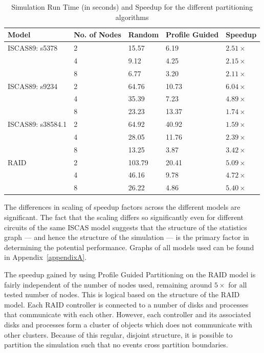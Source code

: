\documentclass[11pt]{book}
\begin{document}
\begin{table}[h]\label{tab:benchmarks}
\centering
\begin{tabular}{@{}lllll@{}}
\toprule
Model             & No. of Nodes & Random & Profile Guided & Speedup           \\ \midrule
ISCAS89: s5378    & 2            & 15.57  & 6.19           & \(2.51\times\)    \\
                  & 4            & 9.12   & 4.25           & \(2.15\times\)    \\
                  & 8            & 6.77   & 3.20           & \(2.11\times\)    \\ \midrule
ISCAS89: s9234    & 2            & 64.76  & 10.73          & \(6.04\times\)    \\
                  & 4            & 35.39  & 7.23           & \(4.89\times\)    \\
                  & 8            & 23.23  & 13.37          & \(1.74\times\)    \\ \midrule
ISCAS89: s38584.1 & 2            & 64.92  & 40.92          & \(1.59\times\)    \\
                  & 4            & 28.05  & 11.76          & \(2.39\times\)    \\
                  & 8            & 13.25  & 3.87           & \(3.42\times\)    \\ \midrule
RAID              & 2            & 103.79 & 20.41          & \(5.09\times\)    \\
                  & 4            & 46.16  & 9.78           & \(4.72\times\)    \\
                  & 8            & 26.22  & 4.86           & \(5.40\times\)    \\ \bottomrule
\end{tabular}
\caption{Simulation Run Time (in seconds) and Speedup for the different partitioning algorithms}
\end{table}

The differences in scaling of speedup factors across the different models are significant. The fact that the scaling differs so significantly even for different circuits of the same ISCAS model suggests that the structure of the statistics graph --- and hence the structure of the simulation --- is the primary factor in determining the potential performance. Graphs of all models used can be found in Appendix~\ref{appendixA}.

The speedup gained by using Profile Guided Partitioning on the RAID model is fairly independent of the number of nodes used, remaining around \(5\times\) for all tested number of nodes. This is logical based on the structure of the RAID model. Each RAID controller is connected to a number of disks and processes that communicate with each other. However, each controller and its associated disks and processes form a cluster of objects which does not communicate with other clusters. Because of this regular, disjoint structure, it is possible to partition the simulation such that no events cross partition boundaries.
\end{document}
